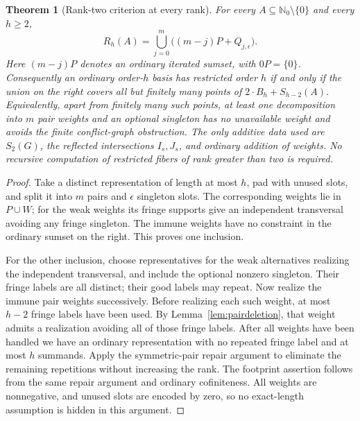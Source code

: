 \documentclass[11pt]{article}
\newtheorem{theorem}{Theorem}[section]
\theoremstyle{remark}\newtheorem{remark}[theorem]{Remark}
\newcommand{\N}{\mathbb N_0}
\begin{document}
\begin{theorem}[Rank-two criterion at every rank]\label{thm:pairdirect}
For every $A\subseteq\N\setminus\{0\}$ and every $h\ge2$,
\begin{equation}\label{eq:pairdirect}
 R_h(A)=\bigcup_{j=0}^{m}\bigl((m-j)P+Q_{j,\epsilon}\bigr).
\end{equation}
Here $(m-j)P$ denotes an \emph{ordinary} iterated sumset, with $0P=\{0\}$. Consequently an ordinary order-$h$ basis has restricted order $h$ if and only if the union on the right covers all but finitely many points of $2\cdot B_h+S_{h-2}(A)$. Equivalently, apart from finitely many such points, at least one decomposition into $m$ pair weights and an optional singleton has no unavailable weight and avoids the finite conflict-graph obstruction. The only additive data used are $S_2(G)$, the reflected intersections $I_s,J_s$, and ordinary addition of weights. No recursive computation of restricted fibers of rank greater than two is required.
\end{theorem}
\begin{proof}
Take a distinct representation of length at most $h$, pad with unused slots, and split it into $m$ pairs and $\epsilon$ singleton slots. The corresponding weights lie in $P\cup W$; for the weak weights its fringe supports give an independent transversal avoiding any fringe singleton. The immune weights have no constraint in the ordinary sumset on the right. This proves one inclusion.

For the other inclusion, choose representatives for the weak alternatives realizing the independent transversal, and include the optional nonzero singleton. Their fringe labels are all distinct; their good labels may repeat. Now realize the immune pair weights successively. Before realizing each such weight, at most $h-2$ fringe labels have been used. By Lemma~\ref{lem:pairdeletion}, that weight admits a realization avoiding all of those fringe labels. After all weights have been handled we have an ordinary representation with no repeated fringe label and at most $h$ summands. Apply the symmetric-pair repair argument to eliminate the remaining repetitions without increasing the rank. The footprint assertion follows from the same repair argument and ordinary cofiniteness. All weights are nonnegative, and unused slots are encoded by zero, so no exact-length assumption is hidden in this argument.
\end{proof}
\end{document}
